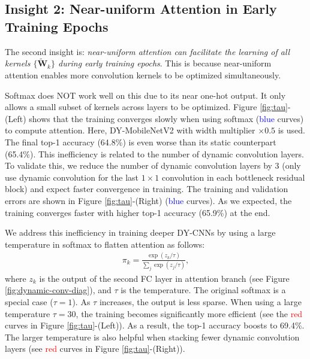 \documentclass[10pt,twocolumn,letterpaper]{article}
\begin{document}
\subsection{Insight 2: Near-uniform Attention in Early Training Epochs}
The second insight is: \textit{near-uniform attention can facilitate the learning of all kernels $\{\bm{\tilde{W}}_k\}$ during early training epochs}. 
%
This is because near-uniform attention enables more convolution kernels to be optimized simultaneously.

Softmax does NOT work well on this due to its near one-hot output. It only allows a small subset of kernels across layers to be optimized. Figure \ref{fig:tau}-(Left) shows that the training converges slowly when using softmax (\textcolor{blue}{blue} curves) to compute attention. Here, DY-MobileNetV2 with width multiplier $\times0.5$ is used. The final top-1 accuracy (64.8\%) is even worse than its static counterpart (65.4\%). 
%
This inefficiency is related to the number of dynamic convolution layers.
To validate this, we reduce the number of dynamic convolution layers by 3 (only use dynamic convolution for the last $1\times 1$ convolution in each bottleneck residual block) and expect faster convergence in training. The training and validation errors are shown in Figure \ref{fig:tau}-(Right) (\textcolor{blue}{blue} curves). As we expected, the training converges faster with higher top-1 accuracy (65.9\%) at the end.

We address this inefficiency in training deeper DY-CNNs by using a large temperature in softmax to flatten attention as follows:
\begin{align}
\pi_k=\frac{\exp(z_k/\tau)}{\sum_j\exp(z_j/\tau)},
\label{eq:gumbel}
\end{align}
where $z_k$ is the output of the second FC layer in attention branch (see Figure \ref{fig:dynamic-conv-diag}), and $\tau$ is the temperature.
The original softmax is a special case ($\tau=1$). As $\tau$ increases, the output is less sparse. When using a large temperature $\tau=30$, the training becomes significantly more efficient (see the \textcolor{red}{red} curves in Figure \ref{fig:tau}-(Left)). As a result, the top-1 accuracy boosts to 69.4\%. The larger temperature is also helpful when stacking fewer dynamic convolution layers (see \textcolor{red}{red} curves in Figure \ref{fig:tau}-(Right)). 
\end{document}
